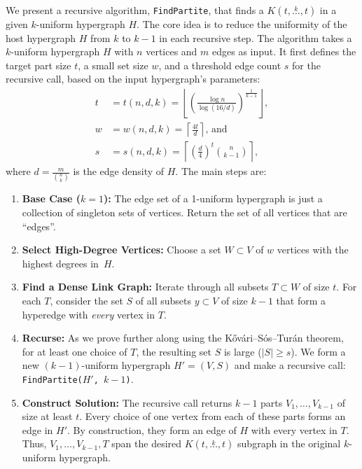 \documentclass{amsart}
\newcommand{\compoverset}[2]{\ensuremath{K(#2, \overset{#1}{\dots}, #2)}}
\begin{document}
    We present a recursive algorithm, \texttt{FindPartite}, that finds a $\compoverset{k}{t}$ in a given $k$-uniform hypergraph $H$.
    The core idea is to reduce the uniformity of the host hypergraph $H$ from $k$ to $k-1$ in each recursive step.
    The algorithm takes a $k$-uniform hypergraph $H$ with $n$ vertices and $m$ edges as input.
    It first defines the target part size $t$, a small set size $w$,
    and a threshold edge count $s$ for the recursive call, based on the input hypergraph's parameters:
    \begin{align*}
        t &= t(n, d, k) = \left\lfloor \left( \frac{\log n}{\log (16/d)}\right)^{\frac{1}{k-1}}\right\rfloor, \\
        w &= w(n, d, k) = \left\lceil \frac{4 t}{d}\right\rceil \text{, and } \\
        s &= s(n, d, k) = \left\lceil \left( \frac{d}{4}\right)^t \binom{n}{k-1}\right\rceil,
    \end{align*}
    where $d = \frac{m}{\binom{n}{k}}$ is the edge density of $H$.
    The main steps are:
    \begin{enumerate}
        \item \textbf{Base Case ($k=1$):} The edge set of a 1-uniform hypergraph is just a collection of singleton sets of vertices.
        Return the set of all vertices that are ``edges''.

        \item \textbf{Select High-Degree Vertices:} Choose a set $W \subset V$ of $w$ vertices with the highest degrees in~$H$. \label{W}

        \item \textbf{Find a Dense Link Graph:} Iterate through all subsets $T \subset W$ of size $t$.
        For each $T$, consider the set $S$ of all subsets $y \subset V$ of size $k-1$ that form a hyperedge with \emph{every} vertex in $T$. \label{link}

        \item \textbf{Recurse:} As we prove further along using the K\H{o}v\'{a}ri–S\'{o}s–Tur\'{a}n theorem, for at least one choice of $T$,
        the resulting set $S$ is large ($|S| \ge s$). We form a new $(k-1)$-uniform hypergraph $H'=(V, S)$ and make a recursive call: \texttt{FindPartite($H'$, $k-1$)}.

        \item \textbf{Construct Solution:} The recursive call returns $k-1$ parts $V_1, \dots, V_{k-1}$ of size at least $t$.
        Every choice of one vertex from each of these parts forms an edge in $H'$.
        By construction, they form an edge of $H$ with every vertex in $T$.
        Thus, $V_1, \dots, V_{k-1}, T$ span the desired $\compoverset{k}{t}$ subgraph in the original $k$-uniform hypergraph.

    \end{enumerate}
\end{document}

